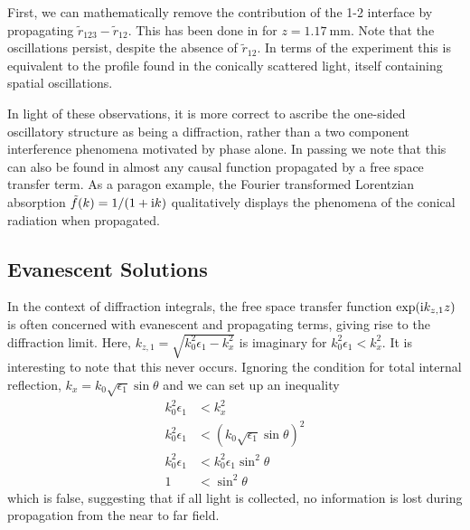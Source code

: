 First, we can mathematically remove the contribution of the 1-2 interface
by propagating $\tilde{r}_{123}-\tilde{r}_{12}$.  This has been done in
 for $z=\SI{1.17}{\milli\meter}$.  Note that the
oscillations persist, despite the absence of $\tilde{r}_{12}$.  In terms of
the experiment this is equivalent to the profile found in the conically
scattered light, itself containing spatial oscillations.

In light of these observations, it is more correct to ascribe the one-sided
oscillatory structure as being a diffraction, rather than a two component
interference phenomena motivated by phase alone.  In passing we note that this can also be found in
almost any causal function propagated by a free space transfer
term. As a paragon example, the Fourier transformed Lorentzian
absorption $\tilde{f}(k) = 1/(1+{\mathrm{i}} k)$ qualitatively displays the
phenomena of the conical radiation when propagated.

\subsection{Evanescent Solutions}
In the context of diffraction integrals, the free space transfer function
$\exp({\mathrm{i}} k_{z,1} z)$ is often concerned with evanescent and propagating
terms, giving rise to the diffraction limit.  Here,
$k_{z,1}=\sqrt{k_0^2 \epsilon_1 - k_x^2}$ is imaginary for $k_0^2
\epsilon_1 < k_x^2$.  It is interesting to note that this never occurs.
Ignoring the condition for total internal reflection, 
$k_x = k_0 \sqrt{\epsilon_1} \sin \theta$ and we can set up an inequality
\begin{align}
k_0^2 \epsilon_1 &< k_x^2\\
k_0^2 \epsilon_1 &< \left(k_0 \sqrt{\epsilon_1} \sin \theta\right)^2\\
k_0^2 \epsilon_1 &< k_0^2 \epsilon_1 \sin^2 \theta\\
1 &< \sin^2 \theta
\end{align}
which is false, suggesting that if all light is collected, no information is
lost during propagation from the near to far field.
